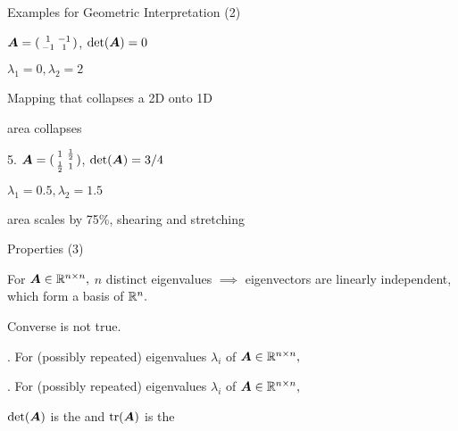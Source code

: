 \documentclass[fleqn,aspectratio=169]{beamer}
\begin{document}
\begin{frame}{Examples for Geometric Interpretation (2)}

\plitemsep 0.03in
\bigskip
{}
{
\small
\bce[4.]
\item $\bm{A} = 
(\begin{smallmatrix}
1 & -1 \cr
-1 & 1
\end{smallmatrix})$, $\det(\bm{A}) = 0$ 

\bci
\item $\lambda_1 = 0, \lambda_2 = 2$
\item Mapping that collapses a 2D onto 1D
\item area collapses
\eci

\bigskip
\item[5.] $\bm{A} = 
(\begin{smallmatrix}
1 & \frac{1}{2} \cr
\frac{1}{2} & 1
\end{smallmatrix})$, $\det(\bm{A}) = 3/4$
\bci
\item $\lambda_1 = 0.5, \lambda_2 = 1.5$
\item area scales by 75\%, shearing and stretching
\eci
\ece
}
{
\vspace{-0.5cm}
\centering
{}

\vspace{0.5cm}

}

\end{frame}


\begin{frame}{Properties (3)}

\plitemsep 0.05in

\bci
\item For $\bm{A} \in {\mathbb R}^{n \times n},$ $n$ distinct eigenvalues $\implies$ eigenvectors are linearly independent, which form a basis of ${\mathbb R}^n.$
 \bci
 \item Converse is not true.
 \item {} 
 \eci

\item {}. For (possibly repeated) eigenvalues $\lambda_i$ of $\bm{A} \in {\mathbb R}^{n \times n},$ 
\item {}. For (possibly repeated) eigenvalues $\lambda_i$ of $\bm{A} \in {\mathbb R}^{n \times n},$ 
\item \msg $\det(\bm{A})$ is the  and $\operatorname{tr}(\bm{A})$ is the 

\eci
\end{frame}
\end{document}

